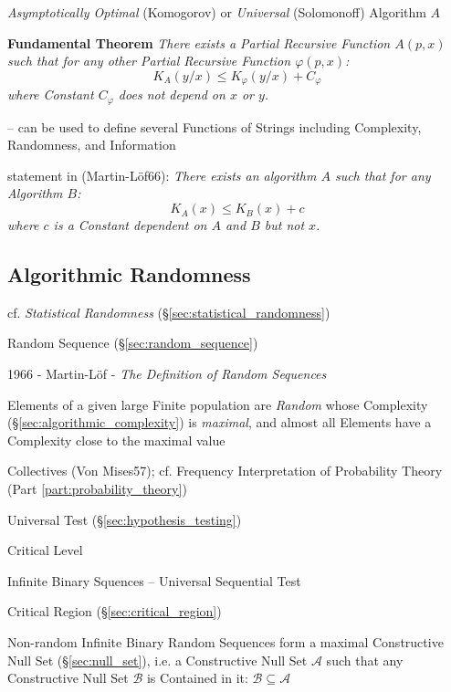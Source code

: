 \emph{Asymptotically Optimal} (Komogorov) or \emph{Universal} (Solomonoff)
Algorithm $A$

\textbf{Fundamental Theorem} \emph{
  There exists a Partial Recursive Function $A(p, x)$ such that for any other
  Partial Recursive Function $\varphi(p, x)$:
  \[
    K_A(y/x) \leq K_\varphi(y/x) + C_\varphi
  \]
  where Constant $C_\varphi$ does not depend on $x$ or $y$.
}

-- can be used to define several Functions of Strings including Complexity,
Randomness, and Information

statement in (Martin-L\"of66):
\emph{
  There exists an algorithm $A$ such that for any Algorithm $B$:
  \[
    K_A(x) \leq K_B(x) + c
  \]
  where $c$ is a Constant dependent on $A$ and $B$ but not $x$.
}



\subsection{Algorithmic Randomness}\label{sec:algorithmic_randomness}

cf. \emph{Statistical Randomness} (\S\ref{sec:statistical_randomness})

Random Sequence (\S\ref{sec:random_sequence})

1966 - Martin-L\"of - \emph{The Definition of Random Sequences}

Elements of a given large Finite population are \emph{Random} whose Complexity
(\S\ref{sec:algorithmic_complexity}) is \emph{maximal}, and almost all Elements
have a Complexity close to the maximal value

Collectives (Von Mises57); cf. Frequency Interpretation of Probability Theory
(Part \ref{part:probability_theory})

Universal Test (\S\ref{sec:hypothesis_testing})

Critical Level

Infinite Binary Squences -- Universal Sequential Test

Critical Region (\S\ref{sec:critical_region})

Non-random Infinite Binary Random Sequences form a maximal Constructive Null Set
(\S\ref{sec:null_set}), i.e. a Constructive Null Set $\mathcal{A}$ such that any
Constructive Null Set $\mathcal{B}$ is Contained in it:
$\mathcal{B} \subseteq \mathcal{A}$

